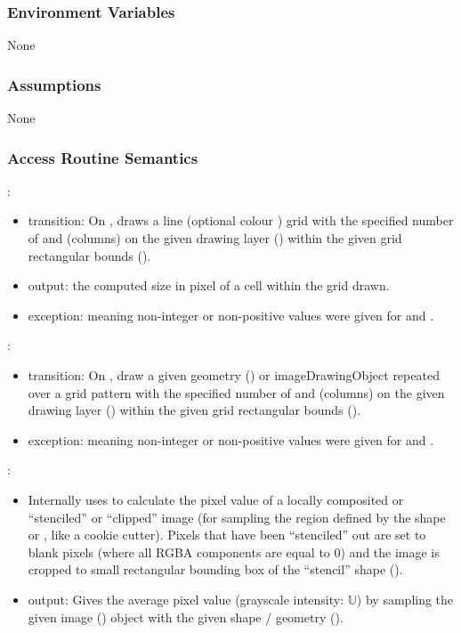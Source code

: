 \documentclass[12pt, titlepage]{article}
\begin{document}
\subsubsection{Environment Variables}
None

\subsubsection{Assumptions}
None

\subsubsection{Access Routine Semantics}

\noindent {}:
\begin{itemize}
\item transition: On , draws a line (optional colour ) grid with the specified
  number of  and  (columns) on the given drawing layer ()
  within the given grid rectangular bounds ().
\item output: the computed size in pixel of a cell within the grid drawn.
\item exception:  meaning non-integer or non-positive values were given for
   and .
\end{itemize}

\noindent {}:
\begin{itemize}
\item transition: On , draw a given geometry () or imageDrawingObject repeated over a grid pattern
  with the specified number of  and  (columns) on the given drawing
  layer () within the given grid rectangular bounds ().
\item exception:  meaning non-integer or non-positive values were given for
   and .
\end{itemize}

\noindent {}:
\begin{itemize}
\item Internally uses  to calculate the pixel value
  of a locally composited or ``stenciled'' or ``clipped'' image (for sampling the region
  defined by the shape or , like a cookie cutter).
  Pixels that have been ``stenciled'' out are set to blank pixels (where all RGBA components are equal to 0)
  and the image is cropped to small rectangular bounding box of the ``stencil'' shape ().
\item output: Gives the average pixel value (grayscale intensity: $\mathbb{U}$) by sampling the given image
  () object with the given shape / geometry ().
\end{itemize}
\end{document}
